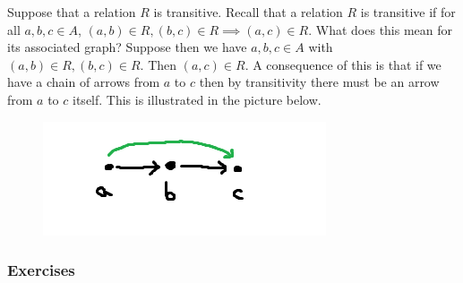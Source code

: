 \begin{example}\label{gp1}
Suppose that a relation $R$ is transitive. Recall that a relation $R$ is transitive if for all $a, b, c \in A$, $(a, b) \in R, (b, c) \in R \implies (a, c) \in R$. What does this mean for its associated graph? Suppose then we have $a, b, c \in A$ with $(a, b) \in R, (b, c) \in R$. Then $(a, c) \in R$. A consequence of this is that if we have a chain of arrows from $a$ to $c$ then by transitivity there must be an arrow from $a$ to $c$ itself. This is illustrated in the picture below.
\end{example}
\begin{figure}[ht]
\centering
\includegraphics{Ch3/transitivity.png}
\end{figure}


\subsubsection{Exercises}


